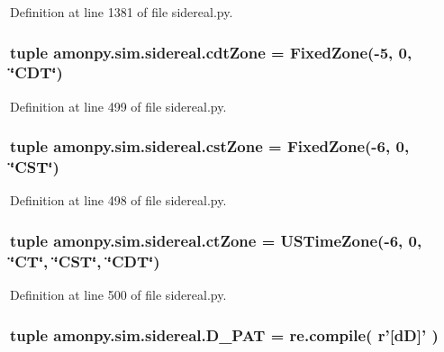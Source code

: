 Definition at line 1381 of file sidereal.\-py.

\hypertarget{namespaceamonpy_1_1sim_1_1sidereal_ad90a055931e7fb716b540ae1f0339ab5}{
\subsubsection[{cdt\-Zone}]{\setlength{\rightskip}{0pt plus 5cm}tuple amonpy.\-sim.\-sidereal.\-cdt\-Zone = {\bf Fixed\-Zone}(-\/5, 0, \char`\"{}C\-D\-T\char`\"{})}}\label{namespaceamonpy_1_1sim_1_1sidereal_ad90a055931e7fb716b540ae1f0339ab5}


Definition at line 499 of file sidereal.\-py.

\hypertarget{namespaceamonpy_1_1sim_1_1sidereal_a549980fae021a9a5bb945772f8dc525a}{
\subsubsection[{cst\-Zone}]{\setlength{\rightskip}{0pt plus 5cm}tuple amonpy.\-sim.\-sidereal.\-cst\-Zone = {\bf Fixed\-Zone}(-\/6, 0, \char`\"{}C\-S\-T\char`\"{})}}\label{namespaceamonpy_1_1sim_1_1sidereal_a549980fae021a9a5bb945772f8dc525a}


Definition at line 498 of file sidereal.\-py.

\hypertarget{namespaceamonpy_1_1sim_1_1sidereal_a43bd98c47eb0b0647dc08ddad348459a}{
\subsubsection[{ct\-Zone}]{\setlength{\rightskip}{0pt plus 5cm}tuple amonpy.\-sim.\-sidereal.\-ct\-Zone = {\bf U\-S\-Time\-Zone}(-\/6, 0, \char`\"{}C\-T\char`\"{}, \char`\"{}C\-S\-T\char`\"{}, \char`\"{}C\-D\-T\char`\"{})}}\label{namespaceamonpy_1_1sim_1_1sidereal_a43bd98c47eb0b0647dc08ddad348459a}


Definition at line 500 of file sidereal.\-py.

\hypertarget{namespaceamonpy_1_1sim_1_1sidereal_ac5ea7c28fe60a3aee05aab43cf7077d0}{
\subsubsection[{D\-\_\-\-P\-A\-T}]{\setlength{\rightskip}{0pt plus 5cm}tuple amonpy.\-sim.\-sidereal.\-D\-\_\-\-P\-A\-T = re.\-compile( r'\mbox{[}d\-D\mbox{]}' )}}\label{namespaceamonpy_1_1sim_1_1sidereal_ac5ea7c28fe60a3aee05aab43cf7077d0}


